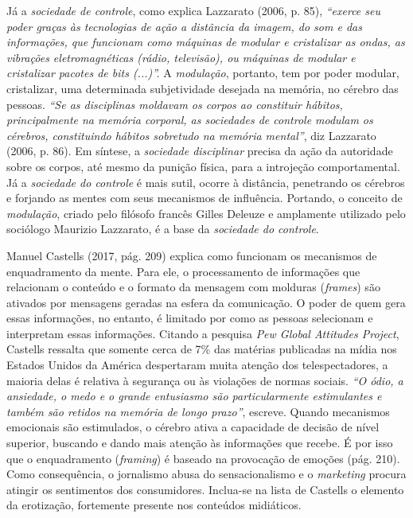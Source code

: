 Já a \emph{sociedade de controle}, como explica Lazzarato (2006, p. 85),
\emph{``exerce seu poder graças às tecnologias de ação a distância da
imagem, do som e das informações, que funcionam como máquinas de modular
e cristalizar as ondas, as vibrações eletromagnéticas (rádio,
televisão), ou máquinas de modular e cristalizar pacotes de bits
(...)''.} A \emph{modulação}, portanto, tem por poder modular,
cristalizar, uma determinada subjetividade desejada na memória, no
cérebro das pessoas. \emph{``Se as disciplinas moldavam os corpos ao
constituir hábitos, principalmente na memória corporal, as sociedades de
controle modulam os cérebros, constituindo hábitos sobretudo na memória
mental''}, diz Lazzarato (2006, p. 86). Em síntese, a \emph{sociedade
disciplinar} precisa da ação da autoridade sobre os corpos, até mesmo da
punição física, para a introjeção comportamental. Já a \emph{sociedade
do controle} é mais sutil, ocorre à distância, penetrando os cérebros e
forjando as mentes com seus mecanismos de influência. Portando, o
conceito de \emph{modulação}, criado pelo filósofo francês Gilles
Deleuze e amplamente utilizado pelo sociólogo Maurizio Lazzarato, é a
base da \emph{sociedade do controle}.

Manuel Castells (2017, pág. 209) explica como funcionam os mecanismos de
enquadramento da mente. Para ele, o processamento de informações que
relacionam o conteúdo e o formato da mensagem com molduras
(\emph{frames}) são ativados por mensagens geradas na esfera da
comunicação. O poder de quem gera essas informações, no entanto, é
limitado por como as pessoas selecionam e interpretam essas informações.
Citando a pesquisa \emph{Pew Global Attitudes Project}, Castells
ressalta que somente cerca de 7\% das matérias publicadas na mídia nos
Estados Unidos da América despertaram muita atenção dos telespectadores,
a maioria delas é relativa à segurança ou às violações de normas
sociais. \emph{``O ódio, a ansiedade, o medo e o grande entusiasmo são
particularmente estimulantes e também são retidos na memória de longo
prazo''}, escreve. Quando mecanismos emocionais são estimulados, o
cérebro ativa a capacidade de decisão de nível superior, buscando e
dando mais atenção às informações que recebe. É por isso que o
enquadramento (\emph{framing}) é baseado na provocação de emoções (pág.
210). Como consequência, o jornalismo abusa do sensacionalismo e o
\emph{marketing} procura atingir os sentimentos dos consumidores.
Inclua-se na lista de Castells o elemento da erotização, fortemente
presente nos conteúdos midiáticos.

